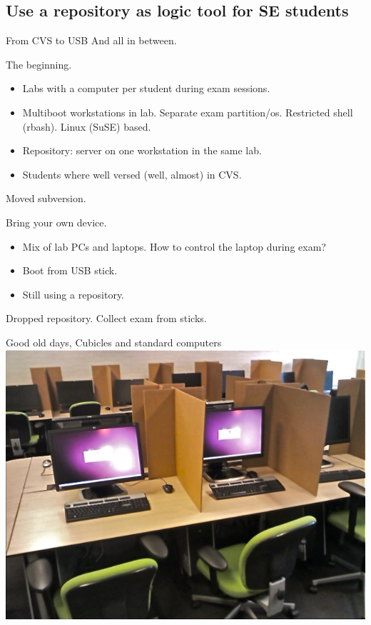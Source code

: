 \subsection[Repository]{Use a repository as logic tool for SE students}
\begin{frame}{From CVS to USB}
  And all in between.
  \begin{description}[short]
  \item[2005] The beginning.
    \begin{itemize}
    \item Labs with a computer per student during exam sessions.
    \item Multiboot workstations in lab. Separate exam 
      partition/os. Restricted shell (rbash). Linux (SuSE) based.
    \item Repository:  server on one workstation in the same lab.
    \item Students where well versed (well, almost) in CVS.
    \end{itemize}
  \item[2009] Moved subversion.
  \item[2012] Bring your own device.
    \begin{itemize}
    \item Mix of lab PCs and laptops. How to control the laptop during exam?
    \item Boot from USB stick.
    \item Still using a repository.
    \end{itemize}
  \item[2015] Dropped repository. Collect exam from sticks.
  \end{description}
\end{frame}

\begin{frame}{Good old days, Cubicles and standard computers}
  \includegraphics[width=\textwidth]{figures/AssessmentRoom.jpg}
\end{frame}

